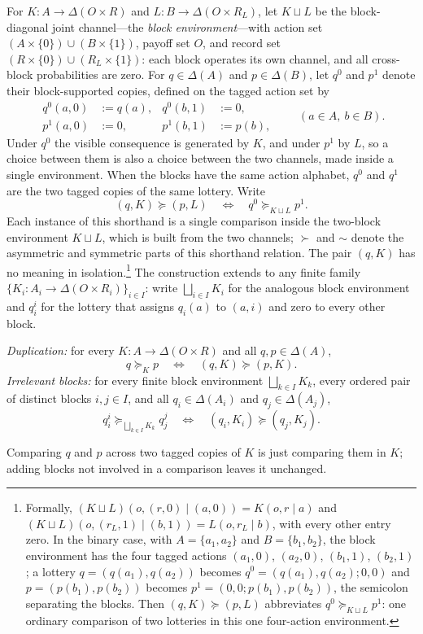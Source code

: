\documentclass[11pt,a4paper]{article}
\theoremstyle{definition}
\newcommand{\D}{\Delta}
\newcommand{\1}{\mathbf 1}
\begin{document}
For
$K:A\to\D(O\times R)$ and $L:B\to\D(O\times R_L)$, let $K\sqcup L$ be the block-diagonal joint channel---the
\emph{block environment}---with action set
$(A\times\{0\})\cup(B\times\{1\})$, payoff set $O$, and record set
$(R\times\{0\})\cup(R_L\times\{1\})$: each block operates its own channel, and all cross-block probabilities
are zero.  For $q\in\D(A)$ and $p\in\D(B)$,
let $q^0$ and $p^1$ denote their
block-supported copies, defined on the tagged action set by
\[
\begin{aligned}
 q^0(a,0)&:=q(a), & q^0(b,1)&:=0,\\
 p^1(a,0)&:=0,    & p^1(b,1)&:=p(b),
\end{aligned}
\qquad(a\in A,\ b\in B).
\]
Under $q^0$ the visible consequence is generated by $K$, and under $p^1$ by $L$, so a choice between them is
also a choice between the two channels, made inside a single environment.  When the blocks have the same action
alphabet, $q^0$ and $q^1$ are the two tagged copies of the same lottery.  Write
\[
 (q,K)\succeq(p,L)
 \quad\Longleftrightarrow\quad
 q^0\succeq_{K\sqcup L}p^1.
\]
Each instance of this shorthand is a single comparison inside the two-block environment $K\sqcup L$, which is
built from the two channels; $\succ$ and $\sim$ denote the asymmetric and symmetric parts of this shorthand
relation.  The pair $(q,K)$
has no meaning in isolation.\footnote{Formally, $(K\sqcup L)(o,(r,0)\mid(a,0))=K(o,r\mid a)$ and
$(K\sqcup L)(o,(r_L,1)\mid(b,1))=L(o,r_L\mid b)$, with every other entry zero.  In the binary case, with
$A=\{a_1,a_2\}$ and $B=\{b_1,b_2\}$, the block environment has the four tagged actions $(a_1,0)$, $(a_2,0)$,
$(b_1,1)$, $(b_2,1)$; a lottery $q=(q(a_1),q(a_2))$ becomes $q^0=(q(a_1),q(a_2);0,0)$ and $p=(p(b_1),p(b_2))$
becomes $p^1=(0,0;p(b_1),p(b_2))$, the semicolon separating the blocks.  Then $(q,K)\succeq(p,L)$ abbreviates
$q^0\succeq_{K\sqcup L}p^1$: one ordinary comparison of two lotteries in this one four-action environment.}  The construction extends to any finite family
$\{K_i:A_i\to\D(O\times R_i)\}_{i\in I}$: write $\bigsqcup_{i\in I}K_i$ for the analogous block environment and
$q_i^i$ for the lottery that assigns $q_i(a)$ to $(a,i)$ and zero to every other block.

\begin{description}[leftmargin=*,style=sameline]

\item[(A5) Block-comparison coherence.]
\emph{Duplication:} for every $K:A\to\D(O\times R)$ and all $q,p\in\D(A)$,
\[
 q\succeq_Kp
 \quad\Longleftrightarrow\quad
 (q,K)\succeq(p,K).
\]
\emph{Irrelevant blocks:} for every finite block environment $\bigsqcup_{k\in I}K_k$, every ordered pair of
distinct blocks $i,j\in I$, and all $q_i\in\D(A_i)$ and $q_j\in\D(A_j)$,
\[
 q_i^i\succeq_{\bigsqcup_{k\in I}K_k}q_j^j
 \quad\Longleftrightarrow\quad
 (q_i,K_i)\succeq(q_j,K_j).
\]

Comparing $q$ and $p$ across two tagged copies of $K$ is just comparing them in $K$; adding blocks not involved
in a comparison leaves it unchanged.

\end{description}
\end{document}
